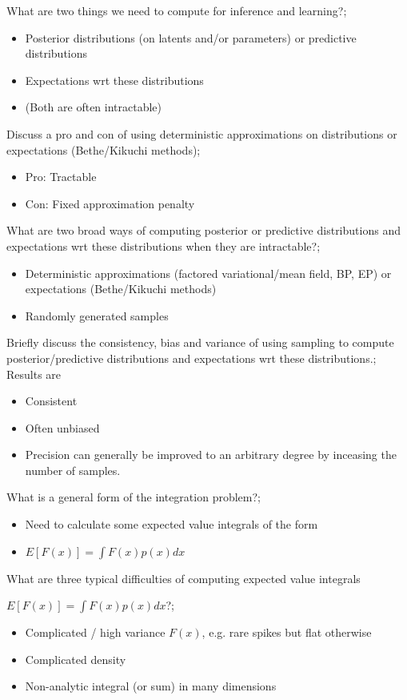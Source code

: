 \documentclass{article}
\begin{document}
What are two things we need to compute for inference and learning?; \begin{itemize} \item Posterior distributions (on latents and/or parameters) or predictive distributions \item Expectations wrt these distributions \item (Both are often intractable) \end{itemize}

Discuss a pro and con of using deterministic approximations on distributions or expectations (Bethe/Kikuchi methods); \begin{itemize} \item Pro: Tractable \item Con: Fixed approximation penalty \end{itemize}

What are two broad ways of computing posterior or predictive distributions and expectations wrt these distributions when they are intractable?; \begin{itemize} \item Deterministic approximations (factored variational/mean field, BP, EP) or expectations (Bethe/Kikuchi methods) \item Randomly generated samples \end{itemize}

Briefly discuss the consistency, bias and variance of using sampling to compute posterior/predictive distributions and expectations wrt these distributions.; Results are \begin{itemize} \item Consistent \item Often unbiased \item Precision can generally be improved to an arbitrary degree by inceasing the number of samples. \end{itemize}


What is a general form of the integration problem?; \begin{itemize} \item Need to calculate some expected value integrals of the form \item $E[F(x)] = \int F(x)p(x)dx$ \end{itemize}

What are three typical difficulties of computing expected value integrals \item $E[F(x)] = \int F(x)p(x)dx$?; \begin{itemize} \item Complicated / high variance $F(x)$, e.g. rare spikes but flat otherwise \item Complicated density \item Non-analytic integral (or sum) in many dimensions \end{itemize} 
\end{document}

